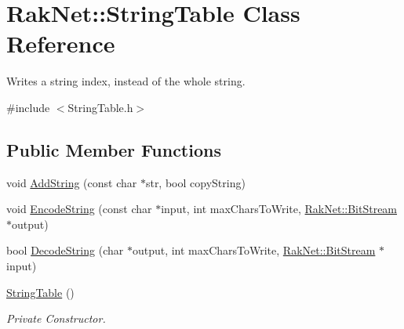 \hypertarget{class_rak_net_1_1_string_table}{\section{Rak\-Net\-:\-:String\-Table Class Reference}
\label{class_rak_net_1_1_string_table}
}


Writes a string index, instead of the whole string.  




{\ttfamily \#include $<$String\-Table.\-h$>$}

\subsection*{Public Member Functions}
\begin{DoxyCompactItemize}
\item 
void \hyperlink{class_rak_net_1_1_string_table_a7da5d7b252198829fc71b1d83ad23e4b}{Add\-String} (const char $\ast$str, bool copy\-String)
\item 
void \hyperlink{class_rak_net_1_1_string_table_ad72386a9d2ee67529f8e1c2ee0075342}{Encode\-String} (const char $\ast$input, int max\-Chars\-To\-Write, \hyperlink{class_rak_net_1_1_bit_stream}{Rak\-Net\-::\-Bit\-Stream} $\ast$output)
\item 
bool \hyperlink{class_rak_net_1_1_string_table_a50d83aa562f438cd26c1469e3a3aa3fc}{Decode\-String} (char $\ast$output, int max\-Chars\-To\-Write, \hyperlink{class_rak_net_1_1_bit_stream}{Rak\-Net\-::\-Bit\-Stream} $\ast$input)
\item 
\hypertarget{class_rak_net_1_1_string_table_a0107c35a886a84fc13434c9bd13ff166}{\hyperlink{class_rak_net_1_1_string_table_a0107c35a886a84fc13434c9bd13ff166}{String\-Table} ()}\label{class_rak_net_1_1_string_table_a0107c35a886a84fc13434c9bd13ff166}

\begin{DoxyCompactList}\small\item\em Private Constructor. \end{DoxyCompactList}\end{DoxyCompactItemize}
